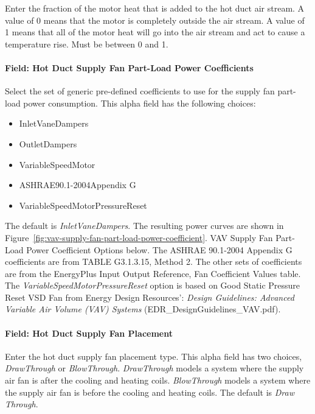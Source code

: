 Enter the fraction of the motor heat that is added to the hot duct air stream. A value of 0 means that the motor is completely outside the air stream. A value of 1 means that all of the motor heat will go into the air stream and act to cause a temperature rise. Must be between 0 and 1.

\paragraph{Field: Hot Duct Supply Fan Part-Load Power Coefficients}\label{field-hot-duct-supply-fan-part-load-power-coefficients}

Select the set of generic pre-defined coefficients to use for the supply fan part-load power consumption. This alpha field has the following choices:

\begin{itemize}
\item
  InletVaneDampers
\item
  OutletDampers
\item
  VariableSpeedMotor
\item
  ASHRAE90.1-2004Appendix G
\item
  VariableSpeedMotorPressureReset
\end{itemize}

The default is \emph{InletVaneDampers}. The resulting power curves are shown in Figure~\ref{fig:vav-supply-fan-part-load-power-coefficient}. VAV Supply Fan Part-Load Power Coefficient Options below. The ASHRAE 90.1-2004 Appendix G coefficients are from TABLE G3.1.3.15, Method 2. The other sets of coefficients are from the EnergyPlus Input Output Reference, Fan Coefficient Values table. The \emph{VariableSpeedMotorPressureReset} option is based on Good Static Pressure Reset VSD Fan from Energy Design Resources': \emph{Design Guidelines: Advanced Variable Air Volume (VAV) Systems} (EDR\_DesignGuidelines\_VAV.pdf).

\paragraph{Field: Hot Duct Supply Fan Placement}\label{field-hot-duct-supply-fan-placement}

Enter the hot duct supply fan placement type. This alpha field has two choices, \emph{DrawThrough} or \emph{BlowThrough}. \emph{DrawThrough} models a system where the supply air fan is after the cooling and heating coils. \emph{BlowThrough} models a system where the supply air fan is before the cooling and heating coils. The default is \emph{Draw Through}.

